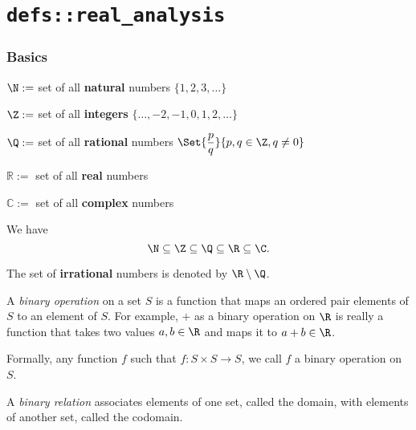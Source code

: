 \chapter{\texttt{defs::real\_analysis}}\label{ded38cd}

\begin{toc}
\end{toc}

\subsection{Basics}\label{b6631c3}

\label{d52c6b7}

\begin{enumerati}
  \item $\N:=$ set of all \textbf{natural} numbers $\{1,2,3,\ldots\}$
  \item $\Z:=$ set of all \textbf{integers} $\{\ldots,-2,-1,0,1,2,\ldots\}$
  \item $\Q:=$ set of all \textbf{rational} numbers $\Set{\dfrac pq}{p,q\in\Z,q\neq0}$
  \item $\mathbb R:=$ set of all \textbf{real} numbers
  \item $\mathbb C:=$ set of all \textbf{complex} numbers
\end{enumerati}

We have
$$
  \N\subseteq\Z\subseteq\Q\subseteq\R\subseteq\C.
$$

The set of \textbf{irrational} numbers is denoted by $\R\setminus\Q$.

\label{d526017}

A \textit{binary operation} on a set $S$ is a function that maps an ordered
pair elements of $S$ to an element of $S$. For example, $+$ as a binary
operation on $\R$ is really a function that takes two values $a,b\in\R$ and
maps it to $a+b\in\R$.

Formally, any function $f$ such that $f:S\times S\to S$, we call $f$ a binary
operation on $S$.

\label{a3a60e1}

A \textit{binary relation} associates elements of one set, called the domain,
with elements of another set, called the codomain.

